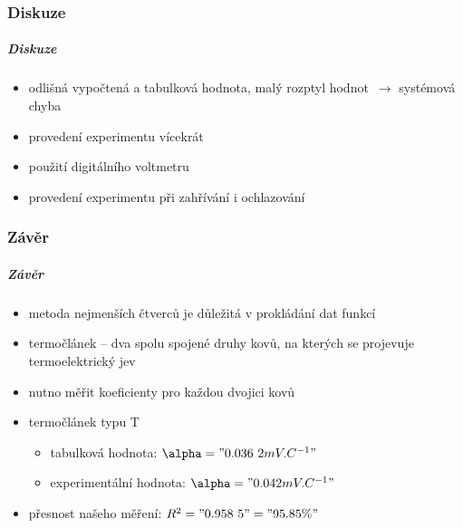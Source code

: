 \documentclass[smaller,aspectratio=1610,handout]{beamer}
\begin{document}
\section{Diskuze}
\begin{frame}
	\frametitle{Diskuze}
	\begin{itemize}
		\item odlišná vypočtená a tabulková hodnota, malý rozptyl 
			hodnot~$\rightarrow$ systémová chyba
		\item provedení experimentu vícekrát
		\item použití digitálního voltmetru
		\item provedení experimentu při zahřívání i ochlazování
	\end{itemize}
\end{frame}

\section{Závěr}
\begin{frame}
	\frametitle{Závěr}
	\begin{itemize}
		\item metoda nejmenších čtverců je důležitá v prokládání dat funkcí
		\item termočlánek -- dva spolu spojené druhy kovů, na kterých se
			projevuje termoelektrický jev
		\item nutno měřit koeficienty pro každou dvojici kovů
		\item termočlánek typu T
			\begin{itemize}
				\item tabulková hodnota: $\alpha = "0.036~2 mV.C^{-1}"$
				\item experimentální hodnota: $\alpha = "0.042 mV.C^{-1}"$
			\end{itemize}
		\item přesnost našeho měření: $R^2="0.958~5"="95.85 \%"$
	\end{itemize}
\end{frame}


\part{}

\begin{frame}[plain]
	\titlepage
\end{frame}
\end{document}
